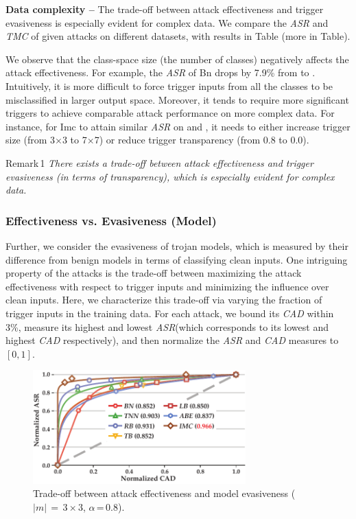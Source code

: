 \documentclass[compsoc,conference,a4paper,10pt,times]{IEEEtran}
\newcommand{\bn}{{\sc Bn}\xspace}
\newcommand{\imc}{{\sc Imc}\xspace}
\newcommand{\asr}{{\em \small ASR}\xspace}
\newcommand{\cad}{{\em \small CAD}\xspace}
\newcommand{\tmc}{{\em \small TMC}\xspace}
\begin{document}
\vspace{2pt}
{\bf Data complexity --} The trade-off between attack effectiveness and trigger evasiveness is especially evident for complex data. We compare the \asr and \tmc of given attacks on different datasets, with results in Table (more in Table). 

We observe that the class-space size (the number of classes) negatively affects the attack effectiveness. For example, the \asr of \bn drops by 7.9\% from \cifar to \ncifar. Intuitively, it is more difficult to force trigger inputs from all the classes to be misclassified in larger output space. Moreover, it tends to require more significant triggers to achieve comparable attack performance on more complex data. For instance, for \imc to attain similar \asr on \cifar and  \imgnet, it needs to either increase trigger size (from 3$\times$3 to 7$\times$7) or reduce trigger transparency (from 0.8 to 0.0).
\begin{mtbox}{\small Remark\,1}
    {\em \small There exists a trade-off between attack effectiveness and trigger evasiveness (in terms of transparency), which is especially evident for complex data.}
\end{mtbox}


\subsubsection{Effectiveness vs. Evasiveness (Model) }

Further, we consider the evasiveness of trojan models, which is measured by their difference from benign models in terms of classifying clean inputs. One intriguing property of the attacks is the trade-off between maximizing the attack effectiveness with respect to trigger inputs and minimizing the influence over clean inputs. Here, we characterize this trade-off via varying the fraction of trigger inputs in the training data. For each attack, we bound its \cad within 3\%, measure its highest and lowest \asr (which corresponds to its lowest and highest \cad respectively), and then normalize the \asr and \cad measures to $[0, 1]$. 


\begin{figure}[!ht]
    \centering
    \includegraphics[width=82mm]{figures/asr-cad-auc.pdf}
    \caption{Trade-off between attack effectiveness and model evasiveness ($|m|\,=\,3\times3$, $\alpha$\,=\,0.8). \label{fig:auc}}
\end{figure}
\end{document}
